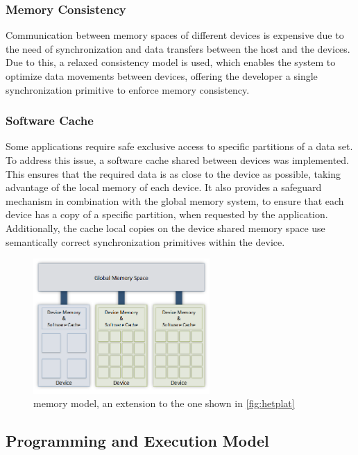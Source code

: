 \documentclass[main.tex]{subfiles}
\begin{document}
\subsubsection{Memory Consistency}

Communication between memory spaces of different devices is expensive due to the need of synchronization and data transfers between the host \cpu and the devices. Due to this, a relaxed consistency model is used, which enables the system to optimize data movements between devices, offering the developer a single synchronization primitive to enforce memory consistency.

\subsubsection{Software Cache}

Some applications require safe exclusive access to specific partitions of a data set. To address this issue, a software cache shared between devices was implemented. This ensures that the required data is as close to the device as possible, taking advantage of the local memory of each device. It also provides a safeguard mechanism in combination with the global memory system, to ensure that each device has a copy of a specific partition, when requested by the application. Additionally, the cache local copies on the device shared memory space use semantically correct synchronization primitives within the device.

\begin{figure}[!htp]
  \centering
  \includegraphics[width=0.6\textwidth]{visio/gama}
  \caption[\gama memory model]{\gama memory model, an extension to the one shown in \cref{fig:hetplat} \label{fig:gama_memory_model}}
\end{figure}

\subsection{Programming and Execution Model}
\end{document}

